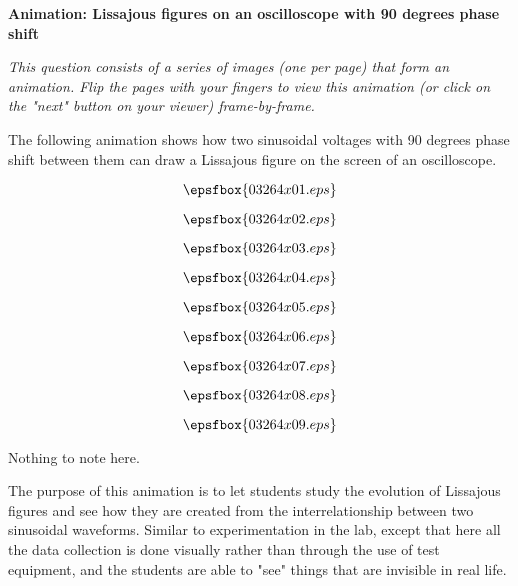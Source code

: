 

\centerline{\bf Animation: Lissajous figures on an oscilloscope with 90 degrees phase shift}

\vskip 10pt

{\it This question consists of a series of images (one per page) that form an animation.  Flip the pages with your fingers to view this animation (or click on the "next" button on your viewer) frame-by-frame.}

\vskip 10pt

The following animation shows how two sinusoidal voltages with 90 degrees phase shift between them can draw a Lissajous figure on the screen of an oscilloscope.

\vfil \eject
$$\epsfbox{03264x01.eps}$$

\vfil \eject
$$\epsfbox{03264x02.eps}$$

\vfil \eject
$$\epsfbox{03264x03.eps}$$

\vfil \eject
$$\epsfbox{03264x04.eps}$$

\vfil \eject
$$\epsfbox{03264x05.eps}$$

\vfil \eject
$$\epsfbox{03264x06.eps}$$

\vfil \eject
$$\epsfbox{03264x07.eps}$$

\vfil \eject
$$\epsfbox{03264x08.eps}$$

\vfil \eject
$$\epsfbox{03264x09.eps}$$


\vfil \eject







Nothing to note here.







The purpose of this animation is to let students study the evolution of Lissajous figures and see how they are created from the interrelationship between two sinusoidal waveforms.  Similar to experimentation in the lab, except that here all the data collection is done visually rather than through the use of test equipment, and the students are able to "see" things that are invisible in real life.





